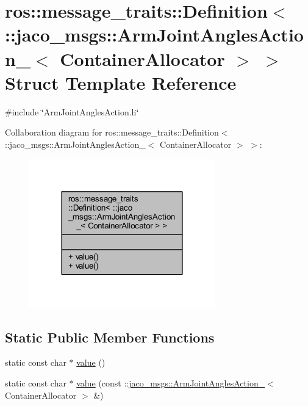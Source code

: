 \hypertarget{structros_1_1message__traits_1_1Definition_3_01_1_1jaco__msgs_1_1ArmJointAnglesAction___3_01ContainerAllocator_01_4_01_4}{}\section{ros\+:\+:message\+\_\+traits\+:\+:Definition$<$ \+:\+:jaco\+\_\+msgs\+:\+:Arm\+Joint\+Angles\+Action\+\_\+$<$ Container\+Allocator $>$ $>$ Struct Template Reference}
\label{structros_1_1message__traits_1_1Definition_3_01_1_1jaco__msgs_1_1ArmJointAnglesAction___3_01ContainerAllocator_01_4_01_4}


{\ttfamily \#include \char`\"{}Arm\+Joint\+Angles\+Action.\+h\char`\"{}}



Collaboration diagram for ros\+:\+:message\+\_\+traits\+:\+:Definition$<$ \+:\+:jaco\+\_\+msgs\+:\+:Arm\+Joint\+Angles\+Action\+\_\+$<$ Container\+Allocator $>$ $>$\+:
\nopagebreak
\begin{figure}[H]
\begin{center}
\leavevmode
\includegraphics[width=228pt]{d0/dee/structros_1_1message__traits_1_1Definition_3_01_1_1jaco__msgs_1_1ArmJointAnglesAction___3_01Cont75711236a6472bb37713012ddf533b9e}
\end{center}
\end{figure}
\subsection*{Static Public Member Functions}
\begin{DoxyCompactItemize}
\item 
static const char $\ast$ \hyperlink{structros_1_1message__traits_1_1Definition_3_01_1_1jaco__msgs_1_1ArmJointAnglesAction___3_01ContainerAllocator_01_4_01_4_a1fbfdc5b04529df88abb7a2f1246e187}{value} ()
\item 
static const char $\ast$ \hyperlink{structros_1_1message__traits_1_1Definition_3_01_1_1jaco__msgs_1_1ArmJointAnglesAction___3_01ContainerAllocator_01_4_01_4_a2dea795dfe581b762a994cce6a25528b}{value} (const \+::\hyperlink{structjaco__msgs_1_1ArmJointAnglesAction__}{jaco\+\_\+msgs\+::\+Arm\+Joint\+Angles\+Action\+\_\+}$<$ Container\+Allocator $>$ \&)
\end{DoxyCompactItemize}


